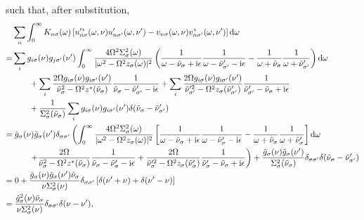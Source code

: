such that, after substitution,
\begin{equation}
\begin{split}
&\sum_n\int_0^\infty K_{n\sigma}(\omega)\left[u_{n\sigma}^{\prime*}(\omega,\nu)u'_{n\sigma'}(\omega,\nu') - v_{n\sigma}(\omega,\nu)v_{n\sigma'}^*(\omega,\nu')\right]\mathrm{d}\omega\\
= &\sum_ig_{i\sigma}(\nu)g_{j\sigma'}(\nu')\int_0^\infty\frac{4\Omega^2\Sigma_\sigma^2(\omega)}{|\omega^2 - \Omega^2z_\sigma(\omega)|^2}\left(\frac{1}{\omega - \tilde{\nu}_\sigma + \mathrm{i}\epsilon}\frac{1}{\omega - \tilde{\nu}'_{\sigma'} - \mathrm{i}\epsilon} - \frac{1}{\omega + \tilde{\nu}_\sigma}\frac{1}{\omega + \tilde{\nu}'_{\sigma'}}\right)\mathrm{d}\omega\\
&\qquad + \sum_i\frac{2\Omega g_{i\sigma}(\nu)g_{i\sigma'}(\nu')}{\tilde{\nu}_\sigma^2 - \Omega^2z^*(\tilde{\nu}_\sigma)}\frac{1}{\tilde{\nu}_\sigma - \tilde{\nu}'_{\sigma'} - \mathrm{i}\epsilon} + \sum_i\frac{2\Omega g_{i\sigma}(\nu)g_{i\sigma'}(\nu')}{\tilde{\nu}^{\prime2}_{\sigma'} - \Omega^2z_\sigma(\tilde{\nu}'_{\sigma'})}\frac{1}{\tilde{\nu}'_{\sigma'} - \tilde{\nu}_\sigma + \mathrm{i}\epsilon}\\
&\qquad + \frac{1}{\Sigma_\sigma^2(\tilde{\nu}_\sigma)}\sum_ig_{i\sigma}(\nu)g_{i\sigma'}(\nu')\delta(\tilde{\nu}_\sigma - \tilde{\nu}'_{\sigma'})\\
= &\; \tilde{g}_{\sigma}(\nu)\tilde{g}_{\sigma}(\nu')\delta_{\sigma\sigma'}\left(\int_0^\infty\frac{4\Omega^2\Sigma_\sigma^2(\omega)}{|\omega^2 - \Omega^2z_\sigma(\omega)|^2}\left[\frac{1}{\omega - \tilde{\nu}_\sigma + \mathrm{i}\epsilon}\frac{1}{\omega - \tilde{\nu}_{\sigma}' - \mathrm{i}\epsilon} - \frac{1}{\omega + \tilde{\nu}_\sigma}\frac{1}{\omega + \tilde{\nu}_\sigma'}\right]\mathrm{d}\omega\right.\\
&\qquad\left. + \frac{2\Omega}{\tilde{\nu}_\sigma^2 - \Omega^2z^*(\tilde{\nu}_\sigma)}\frac{1}{\tilde{\nu}_\sigma - \tilde{\nu}_\sigma' - \mathrm{i}\epsilon} + \frac{2\Omega}{\tilde{\nu}_\sigma^{\prime2} - \Omega^2z_\sigma(\tilde{\nu}_\sigma')}\frac{1}{\tilde{\nu}_\sigma' - \tilde{\nu}_\sigma + \mathrm{i}\epsilon} \vphantom{\int_0^\infty}\right) + \frac{\tilde{g}_{\sigma}(\nu)\tilde{g}_{\sigma}(\nu')}{\Sigma_\sigma^2(\tilde{\nu}_\sigma)}\delta_{\sigma\sigma'}\delta(\tilde{\nu}_\sigma - \tilde{\nu}'_{\sigma'})\\
= &\; 0 + \frac{\tilde{g}_{\sigma}(\nu)\tilde{g}_{\sigma}(\nu')\tilde{\nu}_\sigma}{\nu\Sigma_\sigma^2(\nu)}\delta_{\sigma\sigma'}\left[\delta(\nu' + \nu) + \delta(\nu' - \nu)\right]\\
= &\; \frac{\tilde{g}_{\sigma}^2(\nu)\tilde{\nu}_\sigma}{\nu\Sigma_\sigma^2(\nu)}\delta_{\sigma\sigma'}\delta(\nu - \nu'),
\end{split}
\end{equation}
